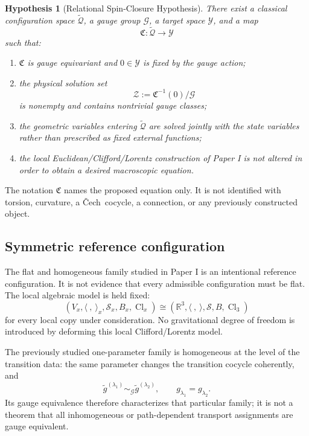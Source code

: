 \documentclass[11pt,a4paper]{article}
\newtheorem{hypothesis}[definition]{Hypothesis}
\theoremstyle{remark}
\newcommand{\R}{\mathbb{R}}
\newcommand{\Cl}{\operatorname{Cl}}
\newcommand{\Smodel}{\mathcal S}
\newcommand{\Cech}{\ifmmode\text{\v{C}ech}\else\v{C}ech\fi}
\newcommand{\tQ}{\widetilde{\mathcal Q}}
\newcommand{\cG}{\mathcal G}
\newcommand{\cY}{\mathcal Y}
\newcommand{\cZ}{\mathcal Z}
\begin{document}
\begin{hypothesis}[Relational Spin-Closure Hypothesis]
There exist a classical configuration space \(\tQ\), a gauge group \(\cG\), a target space \(\cY\), and a map
\begin{equation}
  \mathfrak C:\tQ\longrightarrow\cY
\tag{3.3}
\end{equation}
such that:
\begin{enumerate}[label=(\roman*),leftmargin=2.4em]
\item \(\mathfrak C\) is gauge equivariant and \(0\in\cY\) is fixed by the gauge action;
\item the physical solution set
\begin{equation}
  \cZ:=\mathfrak C^{-1}(0)/\cG
\tag{3.4}
\end{equation}
is nonempty and contains nontrivial gauge classes;
\item the geometric variables entering \(\tQ\) are solved jointly with the state variables rather than prescribed as fixed external functions;
\item the local Euclidean/Clifford/Lorentz construction of Paper I is not altered in order to obtain a desired macroscopic equation.
\end{enumerate}
\end{hypothesis}

The notation \(\mathfrak C\) names the proposed equation only.  It is not identified with torsion, curvature, a \Cech\ cocycle, a connection, or any previously constructed object.

\subsection{Symmetric reference configuration}

The flat and homogeneous family studied in Paper I is an intentional reference configuration.  It is not evidence that every admissible configuration must be flat.  The local algebraic model is held fixed:
\[
  (V_x,\langle\ ,\ \rangle_x,\Smodel_x,B_x,\Cl_x)
  \cong
  (\R^3,\langle\ ,\ \rangle,\Smodel,B,\Cl_3)
\]
for every local copy under consideration.  No gravitational degree of freedom is introduced by deforming this local Clifford/Lorentz model.

The previously studied one-parameter family is homogeneous at the level of the transition data: the same parameter changes the transition cocycle coherently, and
\[
  \widetilde g^{(\lambda_1)}
  \sim_{\cG}
  \widetilde g^{(\lambda_2)},
  \qquad
  g_{\lambda_1}=g_{\lambda_2}.
\]
Its gauge equivalence therefore characterizes that particular family; it is not a theorem that all inhomogeneous or path-dependent transport assignments are gauge equivalent.
\end{document}
